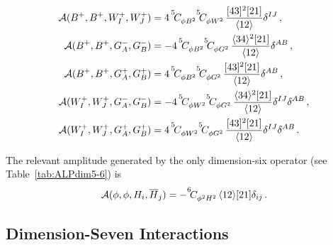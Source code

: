 \begin{align}
    \mathcal A(B^+,B^+,W_I^+,W_J^+) &=  4\, \coef{5}{\phi B^2}{}\coef{5}{\phi W^2}{}\,\frac{\sqr{4}{3}^2 \sqr{2}{1}}{\agl{1}{2}}\delta^{IJ} \,, 
    \\
    \mathcal A(B^+,B^+,G_A^-,G_B^-) &= - 4\, \coef{5}{\phi B^2}{}\coef{5}{\phi G^2}{}\,\frac{\agl{3}{4}^2 \sqr{2}{1}}{\agl{1}{2}}\delta^{AB} \,, 
    \\
    \mathcal A(B^+,B^+,G_A^+,G_B^+) &=  4\, \coef{5}{\phi B^2}{}\coef{5}{\phi G^2}{}\,\frac{\sqr{4}{3}^2 \sqr{2}{1}}{\agl{1}{2}}\delta^{AB} \,, 
    \\
    \mathcal A(W_I^+,W_J^+,G_A^-,G_B^-) &= - 4\, \coef{5}{\phi W^2}{}\coef{5}{\phi G^2}{}\,\frac{\agl{3}{4}^2 \sqr{2}{1}}{\agl{1}{2}}\delta^{IJ}\delta^{AB} \,, 
    \\
    \mathcal A(W_I^+,W_J^+,G_A^+,G_B^+) &=  4\, \coef{5}{\phi W^2}{}\coef{5}{\phi G^2}{}\,\frac{\sqr{4}{3}^2 \sqr{2}{1}}{\agl{1}{2}}\delta^{IJ}\delta^{AB}\,.
\end{align}

The relevant amplitude generated by the only dimension-six operator (see Table~\ref{tab:ALPdim5-6}) is 
\begin{equation}
    \mathcal A(\phi,\phi,H_i,\overline H_j) = -\coef{6}{\phi^2 H^2}{} \,\agl{1}{2}\sqr{2}{1}\delta_{ij}\,.
\end{equation}

\subsection{Dimension-Seven Interactions}

